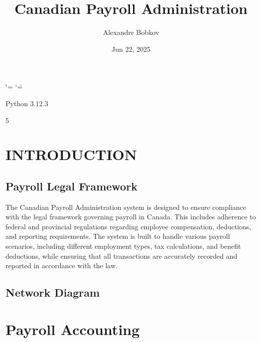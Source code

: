 \documentclass[letterpaper,10pt,english]{sphinxmanual}
\title{Canadian Payroll Administration}
\date{Jun 22, 2025}
\author{Alexandre Bobkov}
\begin{document}
\ifdefined\shorthandoff
  \ifnum\catcode`\=\string=\active\shorthandoff{=}\fi
  \ifnum\catcode`\"=\active{}\fi
\fi

\pagestyle{empty}
\sphinxmaketitle
\pagestyle{plain}
\sphinxtableofcontents
\pagestyle{normal}
\label{\detokenize{index::doc}}


\begin{sphinxVerbatim}[commandchars=\\\{\}]
Python 3.12.3
\end{sphinxVerbatim}

\begin{sphinxVerbatim}[commandchars=\\\{\}]
5
\end{sphinxVerbatim}

\sphinxstepscope


\chapter{INTRODUCTION}
\label{\detokenize{introduction:introduction}}\label{\detokenize{introduction::doc}}

\section{Payroll Legal Framework}
\label{\detokenize{introduction:payroll-legal-framework}}
\sphinxAtStartPar
The Canadian Payroll Administration system is designed to ensure compliance with the legal framework governing payroll in Canada. This includes adherence to federal and provincial regulations regarding employee compensation, deductions, and reporting requirements.
The system is built to handle various payroll scenarios, including different employment types, tax calculations, and benefit deductions, while ensuring that all transactions are accurately recorded and reported in accordance with the law.


\section{Network Diagram}
\label{\detokenize{introduction:network-diagram}}
\sphinxstepscope


\chapter{Payroll Accounting}
\label{\detokenize{payroll_accounting:payroll-accounting}}\label{\detokenize{payroll_accounting::doc}}
\end{document}
